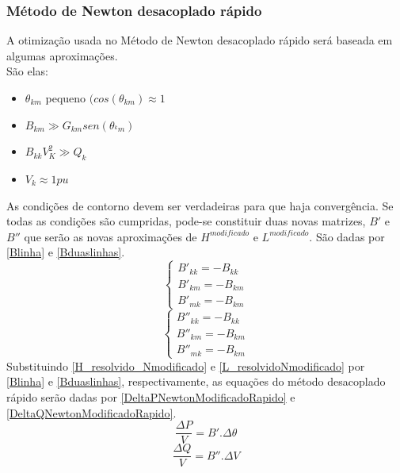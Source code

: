 \subsubsection{Método de Newton desacoplado rápido}
\label{SubsubsectionDesacopladoRapido}
A otimização usada no Método de Newton desacoplado rápido será baseada em algumas aproximações.\\
São elas:
\begin{itemize}
    \item $\theta_{km}$ pequeno $(cos(\theta_{km})\approx 1$
    \item $B_{km}\gg G_{km}sen(\theta_{^km})$
    \item $B_{kk}V_K^2\gg Q_k$
    \item $V_k \approx 1pu$
\end{itemize}
As condições de contorno devem ser verdadeiras para que haja convergência. Se todas as condições são cumpridas, pode-se constituir duas novas matrizes, $B'$ e $B''$ que serão as novas aproximações de $H^{modificado}$ e $L^{modificado}$. São dadas por \ref{Blinha} e \ref{Bduaslinhas}.
\begin{equation}
  \left\{    \begin{array}{lll}
                B'_{kk}=-B_{kk}\\
                B'_{km}=-B_{km}\\
                B'_{mk}=-B_{km}
            \end{array}\right.
    \label{Blinha}
\end{equation}
\begin{equation}
  \left\{    \begin{array}{lll}
                B''_{kk}=-B_{kk}\\
                B''_{km}=-B_{km}\\
                B''_{mk}=-B_{km}
            \end{array}\right.
    \label{Bduaslinhas}
\end{equation}
Substituindo \ref{H_resolvido_Nmodificado} e \ref{L_resolvidoNmodificado} por \ref{Blinha} e \ref{Bduaslinhas}, respectivamente, as equações do método desacoplado rápido serão dadas por \ref{DeltaPNewtonModificadoRapido} e \ref{DeltaQNewtonModificadoRapido}.
\begin{equation}
    \frac{\Delta P}{V} = B'.\Delta\theta
    \label{DeltaPNewtonModificadoRapido}
\end{equation}
\begin{equation}
    \frac{\Delta Q}{V} = B''.\Delta V
    \label{DeltaQNewtonModificadoRapido}
\end{equation}

